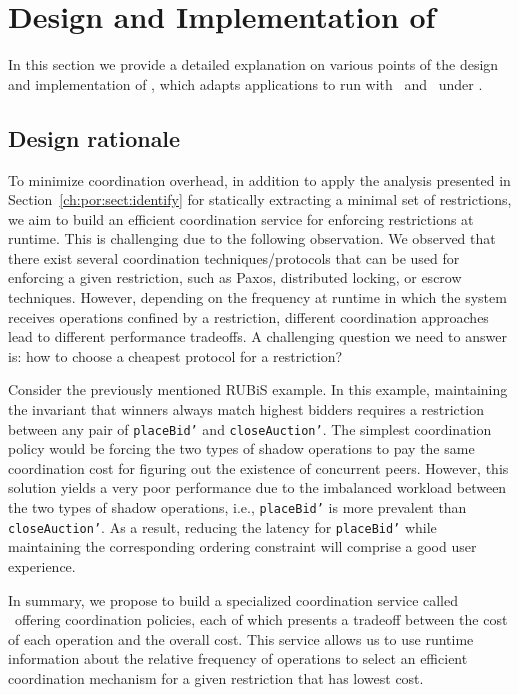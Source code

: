 \section{Design and Implementation of \coordtool}
\label{ch:por:sect:coord}
In this section we provide a detailed explanation on various points of the design
and implementation of \coordtool, which adapts applications to run with \tool\
and \gemini\ under \PRCN.

\subsection{Design rationale}

To minimize coordination overhead, in addition to apply the analysis presented 
in Section~\ref{ch:por:sect:identify} for statically extracting a minimal set 
of restrictions, we aim to build an efficient coordination service for enforcing
restrictions at runtime. This is challenging due to the following observation.
We observed that there exist several coordination techniques/protocols that can be used
for enforcing a given restriction, such as Paxos, distributed locking, or escrow techniques. However, depending on the
frequency at runtime in which the system receives operations confined by a restriction, different coordination approaches 
lead to different performance tradeoffs. A challenging question
we need to answer is: how to choose a cheapest protocol for a restriction?

Consider the previously mentioned RUBiS example. In this example,
maintaining the invariant that winners always match highest 
bidders requires a restriction between any pair of {\tt placeBid'}
and {\tt closeAuction'}. The simplest coordination policy would be forcing the two types of shadow operations to pay the same coordination
cost for figuring out the existence of concurrent peers. However, this solution yields a very poor performance due to the imbalanced workload
between the two types of shadow operations, i.e., {\tt placeBid'} is more prevalent than {\tt closeAuction'}. As a result, reducing the latency for 
{\tt placeBid'} while maintaining the corresponding ordering constraint will comprise
a good user experience. 

In summary, we propose to build a specialized coordination service called \coordtool\ offering
coordination policies, each of which presents a tradeoff between the cost of each operation and 
the overall cost. This service allows us to use runtime information about the relative frequency of operations
to select an efficient coordination mechanism for a given restriction that has lowest cost. 

